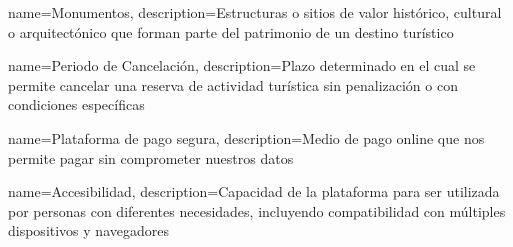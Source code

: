 {
    name=Monumentos,
    description={Estructuras o sitios de valor histórico, cultural o arquitectónico que forman parte del patrimonio de un destino turístico}
}

{
    name=Periodo de Cancelación,
    description={Plazo determinado en el cual se permite cancelar una reserva de actividad turística sin penalización o con condiciones específicas}
}

{
    name=Plataforma de pago segura,
    description={Medio de pago online que nos permite pagar sin comprometer nuestros datos}
}



{
    name=Accesibilidad,
    description={Capacidad de la plataforma para ser utilizada por personas con diferentes necesidades, incluyendo compatibilidad con múltiples dispositivos y navegadores}
}
